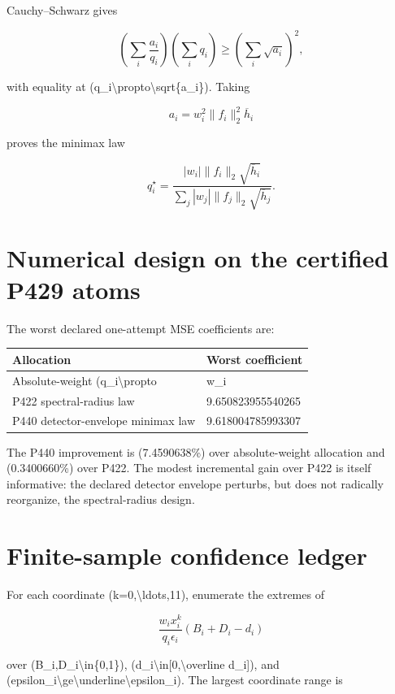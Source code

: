 \documentclass[11pt,a4paper,openany]{report}
\begin{document}
Cauchy--Schwarz gives

\[
\left(\sum_i\frac{a_i}{q_i}\right)
\left(\sum_iq_i\right)
\ge\left(\sum_i\sqrt{a_i}\right)^2,
\]

with equality at (q\_i\textbackslash{}propto\textbackslash{}sqrt\{a\_i\}). Taking

\[
a_i=w_i^2\|f_i\|_2^2\overline h_i
\]

proves the minimax law

\[
q_i^\star
=\frac{|w_i|\|f_i\|_2\sqrt{\overline h_i}}
{\sum_j|w_j|\|f_j\|_2\sqrt{\overline h_j}}.
\]

\section{Numerical design on the certified P429 atoms}

The worst declared one-attempt MSE coefficients are:

\begin{center}
\begingroup\small
\setlength{\tabcolsep}{2.5pt}
\renewcommand{\arraystretch}{1.16}
\begin{longtable}{@{}p{}p{}@{}}
\toprule
\textbf{Allocation} & \textbf{Worst coefficient} \\
\midrule
\endhead
Absolute-weight (q\_i\textbackslash{}propto & w\_i \\
P422 spectral-radius law & 9.650823955540265 \\
P440 detector-envelope minimax law & 9.618004785993307 \\
\bottomrule
\end{longtable}
\endgroup
\end{center}

The P440 improvement is (7.4590638\%) over absolute-weight allocation and (0.3400660\%) over P422. The modest incremental gain over P422 is itself informative: the declared detector envelope perturbs, but does not radically reorganize, the spectral-radius design.

\section{Finite-sample confidence ledger}

For each coordinate (k=0,\textbackslash{}ldots,11), enumerate the extremes of

\[
\frac{w_ix_i^k}{q_i\epsilon_i}(B_i+D_i-d_i)
\]

over (B\_i,D\_i\textbackslash{}in\{0,1\}), (d\_i\textbackslash{}in[0,\textbackslash{}overline d\_i]), and (epsilon\_i\textbackslash{}ge\textbackslash{}underline\textbackslash{}epsilon\_i). The largest coordinate range is
\end{document}
